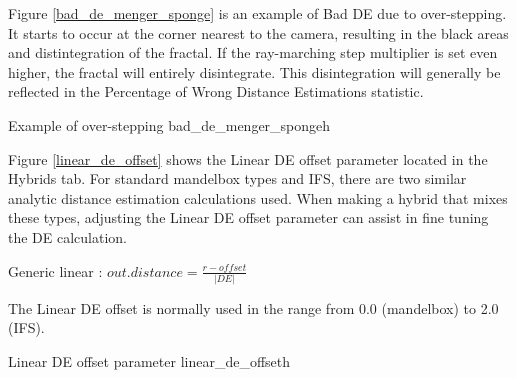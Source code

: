 Figure \ref{bad_de_menger_sponge} is an example of Bad DE due to over-stepping. It starts to occur at the corner nearest to the camera, resulting in the black areas and distintegration of the fractal. If the ray-marching step multiplier is set even higher, the fractal will entirely disintegrate. This disintegration will generally be reflected in the Percentage of Wrong Distance Estimations statistic.

{Example of over-stepping}
{bad_de_menger_sponge}{h}

Figure \ref{linear_de_offset} shows the Linear DE offset parameter located in the Hybrids tab.
For standard mandelbox types and IFS, there are two similar analytic distance estimation calculations used. When making a hybrid that mixes these types, adjusting the Linear DE offset parameter can assist in fine tuning the DE calculation.

Generic  linear : $ out.distance = \frac{r - offset}{\lvert DE \rvert} $

The Linear DE offset is normally used in the range from 0.0 (mandelbox) to 2.0 (IFS).
 
{Linear DE offset parameter}
{linear_de_offset}{h}

